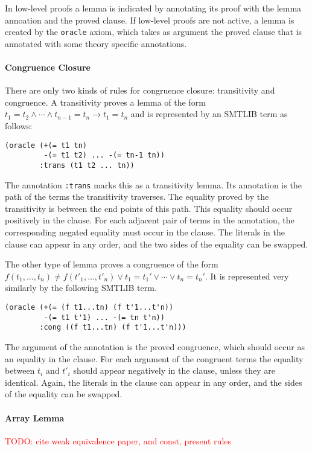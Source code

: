 \documentclass[a4paper]{article}
\newcommand\todo[1]{\textcolor{red}{TODO: #1}}
\begin{document}
In low-level proofs a lemma is indicated by annotating its proof with
the lemma annoation and the proved clause.  If low-level proofs are
not active, a lemma is created by the \verb+oracle+ axiom, which
takes as argument the proved clause that is annotated with some theory
specific annotations.

\paragraph{Congruence Closure}

There are only two kinds of rules for congruence closure: transitivity
and congruence.  A transitivity proves a lemma of the form ${t_1 = t_2}
\land \cdots\land {t_{n-1}= t_n} \rightarrow {t_1 = t_n}$ and is
represented by an SMTLIB term as follows:

\begin{verbatim}
(oracle (+(= t1 tn)
         -(= t1 t2) ... -(= tn-1 tn))
        :trans (t1 t2 ... tn))
\end{verbatim}

The annotation \verb+:trans+ marks this as a transitivity lemma.  Its
annotation is the path of the terms the transitivity traverses.  The
equality proved by the transitivity is between the end points of this
path.  This equality should occur positively in the clause.
For each adjacent pair of terms in the annotation, the
corresponding negated equality must occur in the clause.  The
literals in the clause can appear in any order, and the two sides of
the equality can be swapped.

The other type of lemma proves a congruence of the form $f(t_1, \dots,
t_n)\neq f(t'_1,\dots,t'_n) \lor t_1=t_1' \lor \cdots \lor t_n=t_n'$.
It is represented very similarly by the following SMTLIB term.

\begin{verbatim}
(oracle (+(= (f t1...tn) (f t'1...t'n))
         -(= t1 t'1) ... -(= tn t'n))
        :cong ((f t1...tn) (f t'1...t'n)))
\end{verbatim}

The argument of the annotation is the proved congruence, which should
occur as an equality in the clause.  For each argument of the
congruent terms the equality between $t_i$ and $t'_i$ should appear
negatively in the clause, unless they are identical.  Again, the
literals in the clause can appear in any order, and the sides of
the equality can be swapped.

\paragraph{Array Lemma}
\todo{cite weak equivalence paper, and const, present rules}
\end{document}
